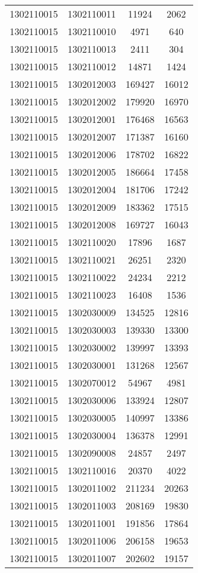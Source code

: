 \begin{longtable}{llcc}
1302110015 & 1302110011 & 11924 & 2062\\
1302110015 & 1302110010 & 4971 & 640\\
1302110015 & 1302110013 & 2411 & 304\\
1302110015 & 1302110012 & 14871 & 1424\\
1302110015 & 1302012003 & 169427 & 16012\\
1302110015 & 1302012002 & 179920 & 16970\\
1302110015 & 1302012001 & 176468 & 16563\\
1302110015 & 1302012007 & 171387 & 16160\\
1302110015 & 1302012006 & 178702 & 16822\\
1302110015 & 1302012005 & 186664 & 17458\\
1302110015 & 1302012004 & 181706 & 17242\\
1302110015 & 1302012009 & 183362 & 17515\\
1302110015 & 1302012008 & 169727 & 16043\\
1302110015 & 1302110020 & 17896 & 1687\\
1302110015 & 1302110021 & 26251 & 2320\\
1302110015 & 1302110022 & 24234 & 2212\\
1302110015 & 1302110023 & 16408 & 1536\\
1302110015 & 1302030009 & 134525 & 12816\\
1302110015 & 1302030003 & 139330 & 13300\\
1302110015 & 1302030002 & 139997 & 13393\\
1302110015 & 1302030001 & 131268 & 12567\\
1302110015 & 1302070012 & 54967 & 4981\\
1302110015 & 1302030006 & 133924 & 12807\\
1302110015 & 1302030005 & 140997 & 13386\\
1302110015 & 1302030004 & 136378 & 12991\\
1302110015 & 1302090008 & 24857 & 2497\\
1302110015 & 1302110016 & 20370 & 4022\\
1302110015 & 1302011002 & 211234 & 20263\\
1302110015 & 1302011003 & 208169 & 19830\\
1302110015 & 1302011001 & 191856 & 17864\\
1302110015 & 1302011006 & 206158 & 19653\\
1302110015 & 1302011007 & 202602 & 19157\\

\end{longtable}
